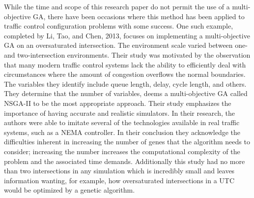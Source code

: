 While the time and scope of this research paper do not permit the use of a multi-objective GA, there have been occasions where this method has been applied to traffic control configuration problems with some success.  One such example, completed by Li, Tao, and Chen, 2013\cite{moGA}, focuses on implementing a multi-objective GA on an oversaturated intersection.  The environment scale varied between one- and two-intersection environments.  Their study was motivated by the observation that many modern traffic control systems lack the ability to efficiently deal with circumstances where the amount of congestion overflows the normal boundaries.  The variables they identify include queue length, delay, cycle length, and others.  They determine that the number of variables, deems a multi-objective GA called NSGA-II to be the most appropriate approach.  Their study emphasizes the importance of having accurate and realistic simulators.  In their research, the authors were able to imitate several of the technologies available in real traffic systems, such as a NEMA controller.  In their conclusion they acknowledge the difficulties inherent in increasing the number of genes that the algorithm needs to consider; increasing the number increases the computational complexity of the problem and the associated time demands\cite{moGA}.  Additionally this study had no more than two intersections in any simulation which is incredibly small and leaves information wanting, for example, how oversaturated intersections in a UTC would be optimized by a genetic algorithm.  